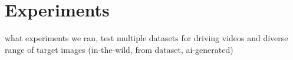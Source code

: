 \section{Experiments}

what experiments we ran, test multiple datasets for driving videos and diverse range of target images (in-the-wild, from dataset, ai-generated)